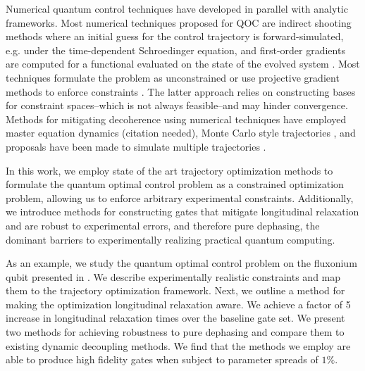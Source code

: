 \documentclass[
  amsfonts,
  amsmath,
  tbtags,
  amssymb,
  aps,
  nobibnotes,
  twocolumn,
  superscriptaddress,
]{revtex4-2}
\begin{document}
Numerical quantum control techniques have developed in parallel
with analytic frameworks.
Most numerical techniques proposed for QOC are indirect shooting
methods where an initial guess for the control trajectory is forward-simulated,
e.g. under the time-dependent Schroedinger equation,
and first-order gradients are computed for a functional evaluated
on the state of the evolved system \cite{leung2017speedup,  goerz2019krotov, doria2011optimal,
  abdelhafez2019gradient, machnes2015gradient, leng2019robust}.
Most techniques formulate the
problem as unconstrained or use
projective gradient methods to enforce constraints
\cite{machnes2015gradient}.
The latter approach relies on constructing
bases for constraint spaces--which is not always feasible--and
may hinder convergence.
Methods for mitigating decoherence using numerical
techniques have employed master equation dynamics (citation needed),
Monte Carlo style trajectories \cite{abdelhafez2019gradient},
and proposals have been made to simulate multiple trajectories
\cite{reinhold2019controlling, rembold2020introduction}.

In this work, we employ state of the art
trajectory optimization methods
to formulate the quantum
optimal control problem as a constrained optimization problem, allowing
us to enforce arbitrary experimental constraints.
Additionally,
we introduce methods for constructing gates that mitigate longitudinal
relaxation and are robust to experimental errors, and therefore
pure dephasing, the dominant barriers to experimentally
realizing practical quantum computing.

As an example, we study the quantum optimal control problem on
the fluxonium qubit presented in \cite{zhang2020universal}.
We describe experimentally realistic constraints and map them to
the trajectory optimization framework. Next, we
outline a method for making the optimization longitudinal
relaxation aware. We achieve a factor of 5 increase in longitudinal relaxation times
over the baseline gate set.
We present two methods for achieving robustness to pure dephasing
and compare them to existing dynamic decoupling methods. We find that
the methods we employ are able to produce high fidelity gates when
subject to parameter spreads of $1\%$.


\end{document}
